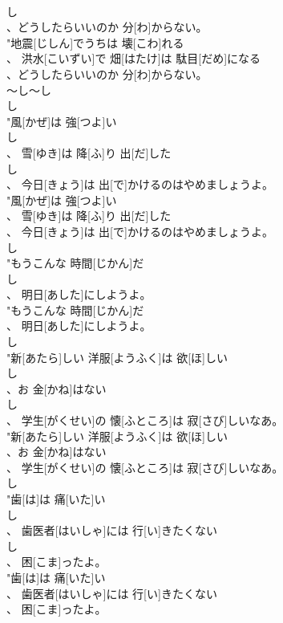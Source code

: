 \documentclass[8pt]{extreport}
\begin{document}
\begin{CJK}{UTF8}{min}
\\	し
\\	、どうしたらいいのか 分[わ]からない。
\\	"地震[じしん]でうちは 壊[こわ]れる
\\	、 洪水[こいずい]で 畑[はたけ]は 駄目[だめ]になる
\\	、どうしたらいいのか 分[わ]からない。
\\	～し～し 
\\	し
\\	"風[かぜ]は 強[つよ]い
\\	し
\\	、 雪[ゆき]は 降[ふ]り 出[だ]した
\\	し
\\	、 今日[きょう]は 出[で]かけるのはやめましょうよ。
\\	"風[かぜ]は 強[つよ]い
\\	、 雪[ゆき]は 降[ふ]り 出[だ]した
\\	、 今日[きょう]は 出[で]かけるのはやめましょうよ。
\\	し
\\	"もうこんな 時間[じかん]だ
\\	し
\\	、 明日[あした]にしようよ。
\\	"もうこんな 時間[じかん]だ
\\	、 明日[あした]にしようよ。
\\	し
\\	"新[あたら]しい 洋服[ようふく]は 欲[ほ]しい
\\	し
\\	、お 金[かね]はない
\\	し
\\	、 学生[がくせい]の 懐[ふところ]は 寂[さび]しいなあ。
\\	"新[あたら]しい 洋服[ようふく]は 欲[ほ]しい
\\	、お 金[かね]はない
\\	、 学生[がくせい]の 懐[ふところ]は 寂[さび]しいなあ。
\\	し
\\	"歯[は]は 痛[いた]い
\\	し
\\	、 歯医者[はいしゃ]には 行[い]きたくない
\\	し
\\	、 困[こま]ったよ。
\\	"歯[は]は 痛[いた]い
\\	、 歯医者[はいしゃ]には 行[い]きたくない
\\	、 困[こま]ったよ。

\end{CJK}
\end{document}
